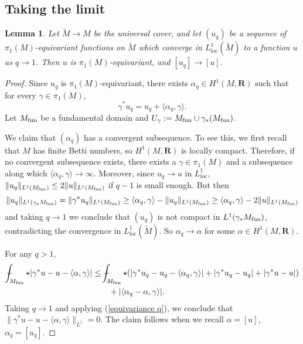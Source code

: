 \documentclass[reqno,11pt]{amsart}
\newcommand{\RR}{\mathbf{R}}
\newcommand{\loc}{\mathrm{loc}}
\newtheorem{lemma}[theorem]{Lemma}
\theoremstyle{definition}
\numberwithin{equation}{section}
\def\Xint#1{\mathchoice
{\XXint\displaystyle\textstyle{#1}}%
{\XXint\textstyle\scriptstyle{#1}}%
{\XXint\scriptstyle\scriptscriptstyle{#1}}%
{\XXint\scriptscriptstyle\scriptscriptstyle{#1}}%
\!\int}
\def\XXint#1#2#3{{\setbox0=\hbox{$#1{#2#3}{\int}$ }
\vcenter{\hbox{$#2#3$ }}\kern-.6\wd0}}
\def\dashint{\Xint-}
\begin{document}
\subsection{Taking the limit}
\begin{lemma}\label{L1 convergence preserves pi1}
Let $\tilde M \to M$ be the universal cover, and let $(u_q)$ be a sequence of $\pi_1(M)$-equivariant functions on $\tilde M$ which converge in $L^1_\loc(\tilde M)$ to a function $u$ as $q \to 1$.
Then $u$ is $\pi_1(M)$-equivariant, and $[u_q] \to [u]$.
\end{lemma}
\begin{proof}
Since $u_q$ is $\pi_1(M)$-equivariant, there exists $\alpha_q \in H^1(M, \RR)$ such that for every $\gamma \in \pi_1(M)$,
\begin{equation}\label{equivariance q}
	\gamma^* u_q = u_q + \langle \alpha_q, \gamma\rangle.
\end{equation}
Let $M_{\rm fun}$ be a fundamental domain and $U_\gamma := M_{\rm fun} \cup \gamma_* (M_{\rm fun})$.

We claim that $(\alpha_q)$ has a convergent subsequence.
To see this, we first recall that $M$ has finite Betti numbers, so $H^1(M, \RR)$ is locally compact.
Therefore, if no convergent subsequence exists, there exists a $\gamma \in \pi_1(M)$ and a subsequence along which $\langle \alpha_q, \gamma\rangle \to \infty$.
Moreover, since $u_q \to u$ in $L^1_\loc$, $\|u_q\|_{L^1(M_{\rm fun})} \leq 2\|u\|_{L^1(M_{\rm fun})}$ if $q - 1$ is small enough.
But then 
$$\|u_q\|_{L^1(\gamma_* M_{\rm fun})} = \|\gamma^* u_q\|_{L^1(M_{\rm fun})} \geq \langle \alpha_q, \gamma\rangle - \|u_q\|_{L^1(M_{\rm fun})} \geq \langle \alpha_q, \gamma\rangle - 2\|u\|_{L^1(M_{\rm fun})}$$
and taking $q \to 1$ we conclude that $(u_q)$ is not compact in $L^1(\gamma_* M_{\rm fun})$, contradicting the convergence in $L^1_\loc(\tilde M)$.
So $\alpha_q \to \alpha$ for some $\alpha \in H^1(M, \RR)$.

For any $q > 1$,
\begin{align*}
\dashint_{M_{\rm fun}} \star |\gamma^* u - u - \langle \alpha, \gamma\rangle| 
&\leq \dashint_{M_{\rm fun}} \star (|\gamma^* u_q - u_q - \langle \alpha_q, \gamma\rangle| + |\gamma^* u_q - u_q| + |\gamma^* u - u|) \\
&\qquad + |\langle \alpha_q - \alpha, \gamma\rangle|.
\end{align*}
Taking $q \to 1$ and applying (\ref{equivariance q}), we conclude that $\|\gamma^* u - u - \langle \alpha, \gamma\rangle\|_{L^1} = 0$.
The claim follows when we recall $\alpha = [u]$, $\alpha_q = [u_q]$.
\end{proof}
\end{document}
